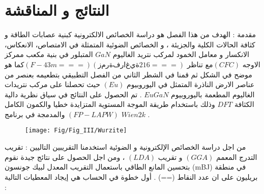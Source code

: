 \chapter{النتائج و المناقشة } %

\label{Chapter3} %

مقدمة :
الهدف من هذا الفصل هو دراسة الخصائص الالكترونية كبنية عصابات الطاقة و كثافة الحالات الكلية والجزيئة ، و الخصائص الضوئية المتمثلة في الامتصاص، الانعكاس، الانكسار و معامل الخمود لمركب نتريد الغاليوم $ GaN $ المتبلور في بنية مكعب ممركز الاوجه $ (CFC)  $مع تناظر $ (F-43m ===) (زمرة فراغية 216===)  $كما هو موضح في الشكل  ثم قمنا في الشطر الثاني من الفصل التطبيقي بتطعيمه بعنصر من عناصر الارض الناذرة المتمثل في اليوروبيوم $ ( Eu ) $ حيث تحصلنا على مركب نتريدات الغاليوم المطعمة باليوروبيوم $ EuGaN $ . تم الحصول على النتائج في سياق نظرية دالية الكثافة $ DFT $ وذلك باستخدام طريقة الموجة المستوية المتزايدة خطيا والكمون الكامل $ (FP-LAPW) $ والمدمجة في برنامج $ Wien2k $ .

\begin{figure}[h!]
	\centering
	\texttt{[image: Fig/Fig\_III/Wurzite]}
	\caption{}
	\label{fig:wurzite}
\end{figure}

من اجل دراسة الخصائص الإلكترونية و الضوئية استخدمنا التقريبين التاليين : تقريب التدرج المعمم $ (GGA) $ و تقريب $ (LDA) $ ، ومن اجل الحصول على نتائج جيدة نقوم بتحسين المانع الطاقي باستعمال التقريب المعدل لبيك جونسون (mBJ) في منطقة بريليون على ان عدد النقاط (==) .
		أول خطوة في الحساب هي إيجاد المعطيات التالية :

